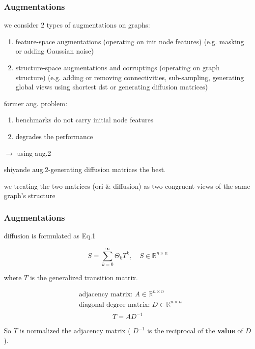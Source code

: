\documentclass[UTF8]{beamer}
\begin{document}
    \begin{frame}
        \frametitle{Augmentations}
        we consider 2 types of augmentations on graphs:
        \begin{enumerate}
            \item feature-space augmentations (operating on init node features) (e.g. masking or adding Gaussian noise)
            \item structure-space augmentations and corruptings (operating on graph structure) (e.g. adding or removing connectivities, sub-sampling, generating global views using shortest dst or generating diffusion matrices)
        \end{enumerate}
        \vspace{.5cm}

        former aug. problem:
        \begin{enumerate}
            \item benchmarks do not carry initial node features
            \item degrades the performance
        \end{enumerate}
        \vspace{.5cm}
        
        $\rightarrow$ using aug.2

        shiyande aug.2-generating diffusion matrices the best.
        \vspace{.5cm}

        we treating the two matrices (ori \& diffusion) as two congruent views of the same graph's structure

    \end{frame}

    \begin{frame}
        \frametitle{Augmentations}

        diffusion is formulated as Eq.1

        \begin{equation*}
            S = \sum_{k=0}^\infty \Theta_kT^k, \quad S\in\mathbb{R}^{n\times n}  \tag{1}
        \end{equation*}

        where $T$ is the generalized transition matrix.

        \begin{equation*}
            \begin{aligned}
            & \text{adjacency matrix: } A\in\mathbb{R}^{n\times n}  \\
            & \text{diagonal degree matrix: } D\in\mathbb{R}^{n\times n}  \\
            \end{aligned}  
        \end{equation*}
        \begin{equation*}
            T = AD^{-1}
        \end{equation*}

        So $T$ is normalized the adjacency matrix ( $D^{-1}$ is the reciprocal of the \textbf{value} of $D$).
        \vspace{.5cm}

    \end{frame}
\end{document}

